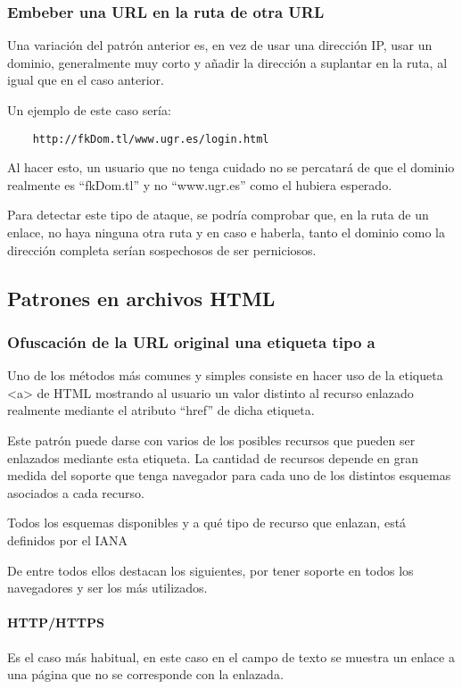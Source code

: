 \subsubsection{Embeber una URL en la ruta de otra URL}
Una variación del patrón anterior es, en vez de usar una dirección IP, usar un dominio, generalmente muy corto y añadir la dirección a suplantar en la ruta, al igual que en el caso anterior.

Un ejemplo de este caso sería: 
\begin{verbatim}
    http://fkDom.tl/www.ugr.es/login.html 
\end{verbatim}
Al hacer esto, un usuario que no tenga cuidado no se percatará de que el dominio realmente es “fkDom.tl” y no “www.ugr.es” como el hubiera esperado. 

Para detectar este tipo de ataque, se podría comprobar que, en la ruta de un enlace, no haya ninguna otra ruta y en caso e haberla, tanto el dominio como la dirección completa serían sospechosos de ser perniciosos. 

\subsection{Patrones en archivos HTML}
\subsubsection{Ofuscación de la URL original una etiqueta tipo a}
Uno de los métodos más comunes y simples consiste en hacer uso de la etiqueta <a> de HTML mostrando al usuario un valor distinto al recurso enlazado realmente mediante el atributo “href” de dicha etiqueta. 

Este patrón puede darse con varios de los posibles recursos que pueden ser enlazados mediante esta etiqueta. La cantidad de recursos depende en gran medida del soporte que tenga navegador para cada uno de los distintos esquemas asociados a cada recurso.

Todos los esquemas disponibles y a qué tipo de recurso que enlazan, está definidos por el IANA \cite{Schemas_dispo}

De entre todos ellos destacan los siguientes, por tener soporte en todos los navegadores y ser los más utilizados.

\paragraph{HTTP/HTTPS}
Es el caso más habitual, en este caso en el campo de texto se muestra un enlace a una página que no se corresponde con la enlazada. 

